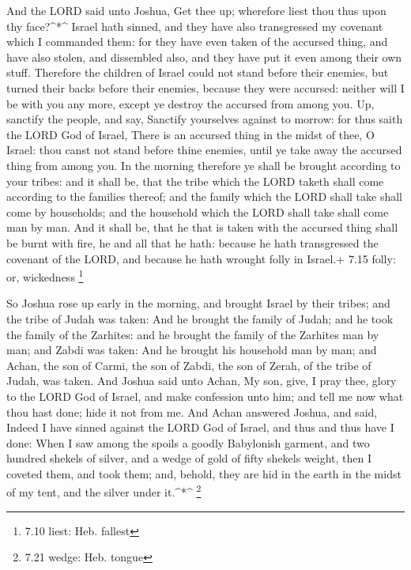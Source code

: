  And the LORD said unto Joshua, Get thee up; wherefore
liest thou thus upon thy face?\^{}*\^{}  Israel hath
sinned, and they have also transgressed my covenant which I commanded
them: for they have even taken of the accursed thing, and have also
stolen, and dissembled also, and they have put it even among their own
stuff.  Therefore the children of Israel could not stand
before their enemies, but turned their backs before their enemies,
because they were accursed: neither will I be with you any more, except
ye destroy the accursed from among you.  Up, sanctify the
people, and say, Sanctify yourselves against to morrow: for thus saith
the LORD God of Israel, There is an accursed thing in the midst of thee,
O Israel: thou canst not stand before thine enemies, until ye take away
the accursed thing from among you.  In the morning
therefore ye shall be brought according to your tribes: and it shall be,
that the tribe which the LORD taketh shall come according to the
families thereof; and the family which the LORD shall take shall come by
households; and the household which the LORD shall take shall come man
by man.  And it shall be, that he that is taken with the
accursed thing shall be burnt with fire, he and all that he hath:
because he hath transgressed the covenant of the LORD, and because he
hath wrought folly in Israel.+ 7.15 folly: or, wickedness \footnote{7.10
  liest: Heb. fallest}

 So Joshua rose up early in the morning, and brought Israel
by their tribes; and the tribe of Judah was taken:  And he
brought the family of Judah; and he took the family of the Zarhites: and
he brought the family of the Zarhites man by man; and Zabdi was taken:
 And he brought his household man by man; and Achan, the
son of Carmi, the son of Zabdi, the son of Zerah, of the tribe of Judah,
was taken.  And Joshua said unto Achan, My son, give, I
pray thee, glory to the LORD God of Israel, and make confession unto
him; and tell me now what thou hast done; hide it not from me.
 And Achan answered Joshua, and said, Indeed I have sinned
against the LORD God of Israel, and thus and thus have I done:
 When I saw among the spoils a goodly Babylonish garment,
and two hundred shekels of silver, and a wedge of gold of fifty shekels
weight, then I coveted them, and took them; and, behold, they are hid in
the earth in the midst of my tent, and the silver under it.\^{}*\^{}
\footnote{7.21 wedge: Heb. tongue}

